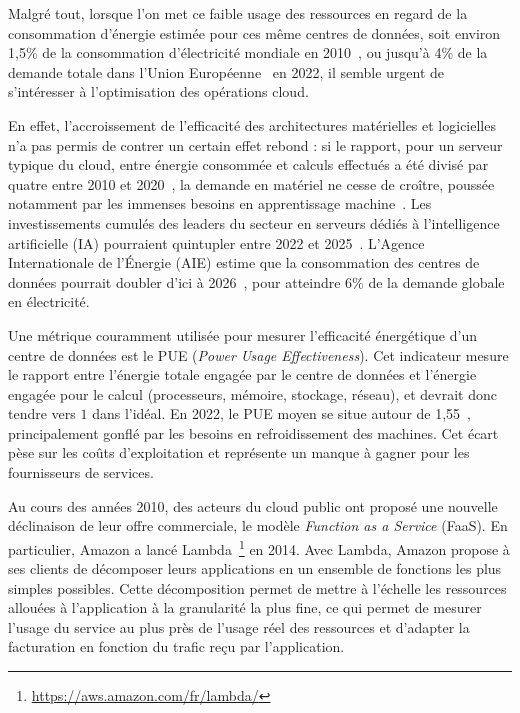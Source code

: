 Malgré tout, lorsque l'on met ce faible usage des ressources en regard de la consommation d'énergie estimée pour ces même centres de données, soit environ 1,5\% de la consommation d'électricité mondiale en 2010~\cite{masanetRecalibratingGlobalData2020}, ou jusqu'à 4\% de la demande totale dans l'Union Européenne~\cite{Electricity2024Analysis2024} en 2022, il semble urgent de s'intéresser à l'optimisation des opérations cloud.

En effet, l'accroissement de l'efficacité des architectures matérielles et logicielles n'a pas permis de contrer un certain effet rebond : si le rapport, pour un serveur typique du cloud, entre énergie consommée et calculs effectués a été divisé par quatre entre 2010 et 2020~\cite{masanetRecalibratingGlobalData2020}, la demande en matériel ne cesse de croître, poussée notamment par les immenses besoins en apprentissage machine~\cite{commentMetaOperate6002024}. Les investissements cumulés des leaders du secteur en serveurs dédiés à l'intelligence artificielle (IA) pourraient quintupler entre 2022 et 2025~\cite{DerriereIADeferlante2024, elderNextWaveAI2024}. L'Agence Internationale de l'Énergie (AIE) estime que la consommation des centres de données pourrait doubler d'ici à 2026~\cite{Electricity2024Analysis2024}, pour atteindre 6\% de la demande globale en électricité.

Une métrique couramment utilisée pour mesurer l'efficacité énergétique d'un centre de données est le PUE (\textit{Power Usage Effectiveness}). Cet indicateur mesure le rapport entre l'énergie totale engagée par le centre de données et l'énergie engagée pour le calcul (processeurs, mémoire, stockage, réseau), et devrait donc tendre vers $1$ dans l'idéal. En 2022, le PUE moyen se situe autour de 1,55~\cite{davisUptimeInstituteGlobal2022}, principalement gonflé par les besoins en refroidissement des machines. Cet écart pèse sur les coûts d'exploitation et représente un manque à gagner pour les fournisseurs de services.

Au cours des années 2010, des acteurs du cloud public ont proposé une nouvelle déclinaison de leur offre commerciale, le modèle \textit{Function as a Service} (FaaS). En particulier, Amazon a lancé Lambda~\footnote{\href{https://aws.amazon.com/fr/lambda/}{https://aws.amazon.com/fr/lambda/}} en 2014. Avec Lambda, Amazon propose à ses clients de décomposer leurs applications en un ensemble de fonctions les plus simples possibles. Cette décomposition permet de mettre à l'échelle les ressources allouées à l'application à la granularité la plus fine, ce qui permet de mesurer l'usage du service au plus près de l'usage réel des ressources et d'adapter la facturation en fonction du trafic reçu par l'application.

